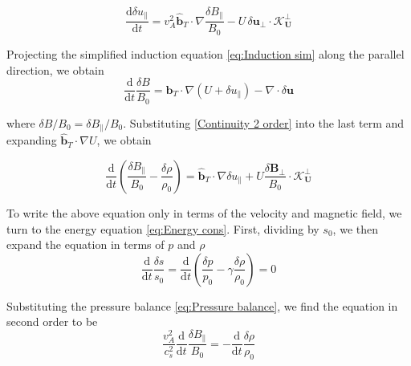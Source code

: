 \begin{equation}
    \frac{\mathrm{d} \delta u_{\parallel}}{\mathrm{d}t}= v_A^2 \hat{\boldsymbol{b}}_{T}  \cdot \nabla \frac{\delta B_{\parallel}}{B_0} -  U\,\delta \boldsymbol{u}_{\perp} \cdot \boldsymbol{\mathcal{K}^{\perp}_{U}}
    \label{eq:Momentum Parallel}
\end{equation}

Projecting the simplified induction equation \eqref{eq:Induction sim} along the parallel direction, we obtain 
\begin{equation}
     \frac{\mathrm{d}}{\mathrm{d}t}\frac{\delta B}{B_0}= \hat{\boldsymbol{b}}_{T}  \cdot \nabla (U + \delta u_{\parallel}) - \nabla \cdot \delta\boldsymbol{u}
\end{equation}

where \(\delta B/B_0 = \delta B_{\parallel}/B_0\). Substituting \eqref{Continuity 2 order} into the last term and expanding \(\hat{\boldsymbol{b}}_{T}  \cdot \nabla U \), we obtain 

\begin{equation}
    \frac{\mathrm{d}}{\mathrm{d}t}\left(\frac{\delta B_{\parallel}}{B_0} - \frac{\delta \rho}{\rho_0}\right) = \hat{\boldsymbol{b}}_{T}  \cdot \nabla\delta u_{\parallel} + U \frac{\delta \boldsymbol{B}_{\perp}}{B_{0}} \cdot \boldsymbol{\mathcal{K}^{\perp}_{U}}
    \label{Induction Parallel almost}
\end{equation}

To write the above equation only in terms of the velocity and magnetic field, we turn to the energy equation \eqref{eq:Energy cons}. First, dividing by \(s_0\), we then expand the equation in terms of \(p\) and \(\rho\)
\begin{equation}
    \frac{\mathrm{d}}{\mathrm{d}t} \frac{\delta s}{s_0}= \frac{\mathrm{d}}{\mathrm{d}t} \left ( \frac{\delta p}{p_0} - \gamma \frac{\delta \rho}{\rho_0} \right)=0
\end{equation}

Substituting the pressure balance \eqref{eq:Pressure balance}, we find the equation in second order to be
\begin{equation}
    \frac{v_A^2}{c_s^2} \frac{\mathrm{d}}{\mathrm{d}t}\frac{\delta B_{\parallel}}{B_0} = -\frac{\mathrm{d}}{\mathrm{d}t} \frac{\delta \rho}{\rho_0} 
    \label{eq:Energy second order}
\end{equation}

